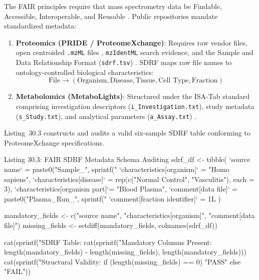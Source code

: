 \documentclass[11pt,twoside,openright]{book}
\begin{document}
The FAIR principles require that mass spectrometry data be Findable, Accessible, Interoperable, and Reusable \cite{wilkinson2016fair}. Public repositories mandate standardized metadata:
\begin{enumerate}
\item \textbf{Proteomics (PRIDE / ProteomeXchange)}: Requires raw vendor files, open centroided \texttt{.mzML} files \cite{martens2011mzml}, \texttt{mzIdentML} search evidence, and the Sample and Data Relationship Format (\texttt{sdrf.tsv}) \cite{deutsch2020pride, perezriverol2022pride}. SDRF maps raw file names to ontology-controlled biological characteristics:
\begin{equation}
\text{File} \longrightarrow (\text{Organism}, \text{Disease}, \text{Tissue}, \text{Cell Type}, \text{Fraction})
\label{eq:sdrf_mapping}
\end{equation}
\item \textbf{Metabolomics (MetaboLights)}: Structured under the ISA-Tab standard comprising investigation descriptors (\texttt{i\_Investigation.txt}), study metadata (\texttt{s\_Study.txt}), and analytical parameters (\texttt{a\_Assay.txt}) \cite{haug2020metabolights, sansone2012toward}.
\end{enumerate}

Listing~30.3 constructs and audits a valid six-sample SDRF table conforming to ProteomeXchange specifications.

\begin{rchunk}{Listing 30.3: FAIR SDRF Metadata Schema Auditing}
sdrf_df <- tibble(
  `source name`                  = paste0("Sample_", sprintf("%
  `characteristics[organism]`    = "Homo sapiens",
  `characteristics[disease]`     = rep(c("Normal Control", "Vasculitis"), each = 3),
  `characteristics[organism part]`= "Blood Plasma",
  `comment[data file]`           = paste0("Plasma_Run_", sprintf("%
  `comment[fraction identifier]` = 1L
)

mandatory_fields <- c("source name", "characteristics[organism]", "comment[data file]")
missing_fields   <- setdiff(mandatory_fields, colnames(sdrf_df))

cat(sprintf("SDRF Table: %
cat(sprintf("Mandatory Columns Present: %
            length(mandatory_fields) - length(missing_fields), length(mandatory_fields)))
cat(sprintf("Structural Validity: %
            if (length(missing_fields) == 0) "PASS" else "FAIL"))
\end{rchunk}
\end{document}
